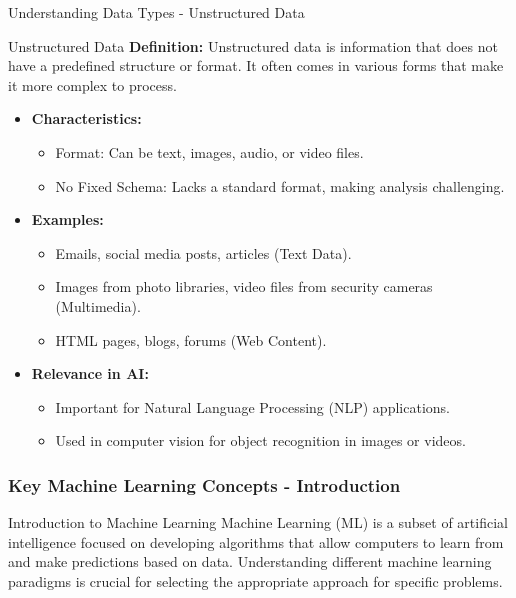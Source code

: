 \documentclass[aspectratio=169]{beamer}
\begin{document}
\begin{frame}[fragile]{Understanding Data Types - Unstructured Data}
    \begin{block}{Unstructured Data}
        \textbf{Definition:} 
        Unstructured data is information that does not have a predefined structure or format. It often comes in various forms that make it more complex to process.
    \end{block}

    \begin{itemize}
        \item \textbf{Characteristics:}
        \begin{itemize}
            \item Format: Can be text, images, audio, or video files.
            \item No Fixed Schema: Lacks a standard format, making analysis challenging.
        \end{itemize}

        \item \textbf{Examples:}
        \begin{itemize}
            \item Emails, social media posts, articles (Text Data).
            \item Images from photo libraries, video files from security cameras (Multimedia).
            \item HTML pages, blogs, forums (Web Content).
        \end{itemize}
        
        \item \textbf{Relevance in AI:}
        \begin{itemize}
            \item Important for Natural Language Processing (NLP) applications.
            \item Used in computer vision for object recognition in images or videos.
        \end{itemize}
    \end{itemize}
\end{frame}

\begin{frame}[fragile]
    \frametitle{Key Machine Learning Concepts - Introduction}
    \begin{block}{Introduction to Machine Learning}
        Machine Learning (ML) is a subset of artificial intelligence focused on developing algorithms that allow computers to learn from and make predictions based on data.
        Understanding different machine learning paradigms is crucial for selecting the appropriate approach for specific problems.
    \end{block}
\end{frame}
\end{document}
